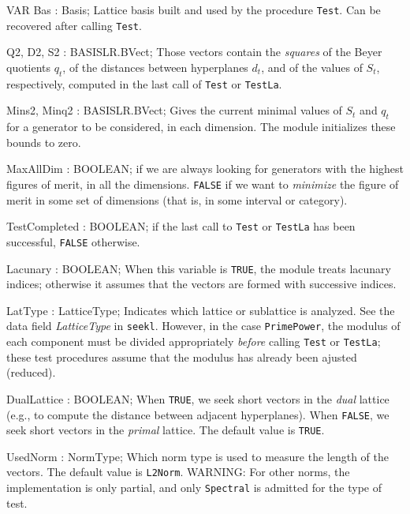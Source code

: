 VAR
   Bas : Basis;
\endcode
 \tabb  Lattice basis built and used by the procedure {\tt Test}.
   Can be recovered after calling {\tt Test}.
 \endtabb
\code

   Q2, D2, S2 : BASISLR.BVect;
\endcode
 \tabb  Those vectors contain the {\em squares\/} of the Beyer 
   quotients $q_t$, of the distances between
   hyperplanes $d_t$, and of the values of $S_t$, respectively, computed in
   the last call of {\tt Test} or {\tt TestLa}.
 \endtabb
\code

   Mins2, Minq2 : BASISLR.BVect;
\endcode
 \tabb  Gives the current minimal values of 
   $S_t$ and $q_t$ for a generator to be considered, in each dimension.
   The module initializes these bounds to zero.
 \endtabb
\code
 
   MaxAllDim : BOOLEAN;
\endcode
  if we are always looking for generators with the
  highest figures of merit, in all the dimensions.
  {\tt FALSE} if we want to {\em minimize\/} the figure of merit in
  some set of dimensions (that is, in some interval or category).
 \endtabb
\code

   TestCompleted : BOOLEAN;
\endcode
  if the last call to {\tt Test} or {\tt TestLa}
  has been successful, {\tt FALSE} otherwise.
 \endtabb
\code

   Lacunary : BOOLEAN;
\endcode
 \tabb  When this variable is {\tt TRUE}, the module treats lacunary
   indices; otherwise it assumes that the vectors are formed with
   successive indices.
 \endtabb
\code

   LatType : LatticeType;
\endcode
 \tabb  Indicates which lattice or sublattice is analyzed.
  See the data field {\em LatticeType\/} in {\tt seekl}.
  However, in the case {\tt PrimePower}, the modulus of each component
  must be divided appropriately {\em before\/} calling {\tt Test}
  or {\tt TestLa}; these test procedures assume that the modulus has 
  already been ajusted (reduced).
 \endtabb
\code

   DualLattice : BOOLEAN;
\endcode
 \tabb When {\tt TRUE}, we seek short vectors in the {\em dual\/}
  lattice (e.g., to compute the distance between adjacent hyperplanes).
  When {\tt FALSE}, we seek short vectors in the {\em primal\/}
  lattice.  The default value is {\tt TRUE}.
 \endtabb
\code

   UsedNorm : NormType;
\endcode
 \tabb  Which norm type is used to measure the length of the vectors.
  The default value is {\tt L2Norm}.
  WARNING: For other norms, the implementation is only partial, and
  only {\tt Spectral} is admitted for the type of test.
 \endtabb
\code

